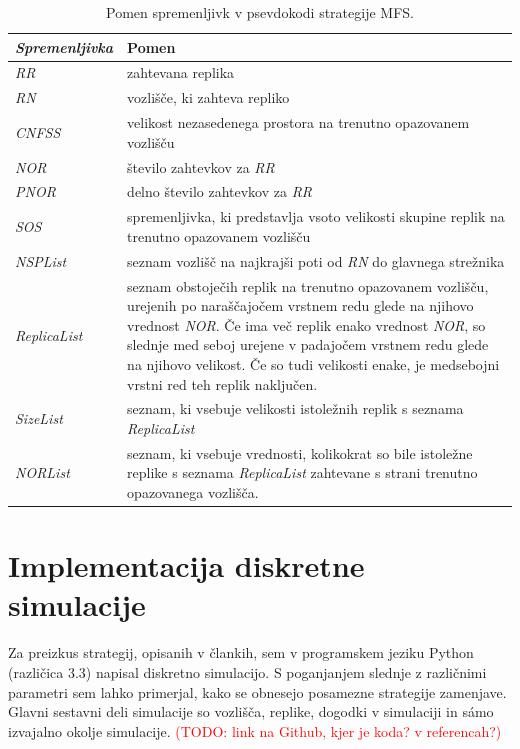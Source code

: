 \documentclass[a4paper, 12pt]{book}
\newcommand{\TODO}[1]{\textcolor{red}{(TODO: #1)}}
\begin{document}
\begin{table}
\small
  \begin{center}
    \begin{tabulary}{1.0\textwidth}{ >{\itshape}p{6.8em} p{26em}}
      \textnormal{Spremenljivka} & Pomen \\
      \hline
      RR & zahtevana replika \\
      RN &  vozlišče, ki zahteva repliko \\
      CNFSS & velikost nezasedenega prostora na trenutno opazovanem
          \mbox{vozlišču} \\
      NOR & število zahtevkov za \textit{RR} \\
      PNOR & delno število zahtevkov za \textit{RR} \\
      SOS & spremenljivka, ki predstavlja vsoto velikosti skupine replik na
          trenutno opazovanem vozlišču \\
      NSPList & seznam vozlišč na najkrajši poti od \textit{RN} do
          glavnega strežnika \\
      ReplicaList & seznam obstoječih replik na trenutno opazovanem vozlišču,
          urejenih po naraščajočem vrstnem redu glede na njihovo vrednost
          \textit{NOR}.
          Če ima več replik enako vrednost \textit{NOR}, so slednje med seboj
          urejene v padajočem vrstnem redu glede na njihovo velikost. Če so
          tudi velikosti enake, je medsebojni vrstni red teh replik
          naključen. \\
      SizeList & seznam, ki vsebuje velikosti istoležnih replik s seznama
          \textit{ReplicaList} \\
      NORList & seznam, ki vsebuje vrednosti, kolikokrat so bile istoležne
          replike s seznama \textit{ReplicaList} zahtevane s strani
          trenutno opazovanega vozlišča. \\
    \end{tabulary}
  \end{center}

  \caption{Pomen spremenljivk v psevdokodi strategije MFS.}
  \label{tbl:MFS_vars}
\end{table}


\section{Implementacija diskretne simulacije}

Za preizkus strategij, opisanih v člankih, sem v programskem jeziku Python
(različica 3.3) napisal diskretno simulacijo. S poganjanjem slednje z
raz\-ličnimi parametri sem lahko primerjal, kako se obnesejo posamezne
strategije zamenjave. Glavni sestavni deli simulacije so vozlišča, replike,
dogodki v simulaciji in sámo izvajalno okolje simulacije. \TODO{link na Github,
kjer je koda? v referencah?}
\end{document}
